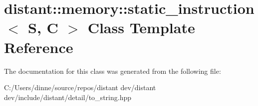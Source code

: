 \hypertarget{classdistant_1_1memory_1_1static__instruction}{}\section{distant\+:\+:memory\+:\+:static\+\_\+instruction$<$ S, C $>$ Class Template Reference}
\label{classdistant_1_1memory_1_1static__instruction}


The documentation for this class was generated from the following file\+:\begin{DoxyCompactItemize}
\item 
C\+:/\+Users/dinne/source/repos/distant dev/distant dev/include/distant/detail/to\+\_\+string.\+hpp\end{DoxyCompactItemize}
